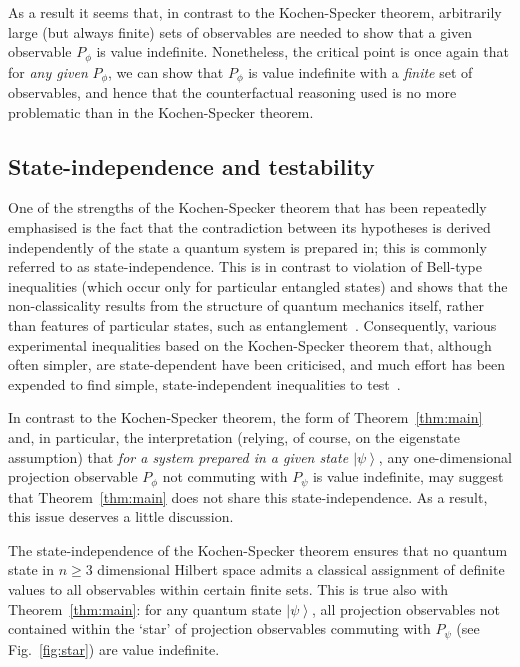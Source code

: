 \documentclass[%
 superscriptaddress,
 preprint,
 showpacs,
 showkeys,
 nofootinbib,
  amsmath,amssymb,
  aps,
  longbibliography,
  floatfix,
 ]{revtex4-1}
\theoremstyle{definition}
\newcommand{\ket}[1]{\left| #1 \right>}
\begin{document}
As a result it seems that, in contrast to the Kochen-Specker theorem, arbitrarily large {\color{blue} (but always finite)} sets of observables are needed to show that a given observable $P_\phi$ is value indefinite.
Nonetheless, the critical point is once again that for \emph{any given} $P_\phi$, we can show that $P_\phi$ is value indefinite with a \emph{finite} set of observables, and hence that the counterfactual reasoning used is no more problematic than in the Kochen-Specker theorem.



\subsection{State-independence and testability}

One of the strengths of the Kochen-Specker theorem that has been repeatedly emphasised is the fact that the contradiction between its hypotheses is derived independently of the state a quantum system is prepared in; this is commonly referred to as state-independence.
This is in contrast to violation of Bell-type inequalities (which occur only for particular entangled states) and shows that the non-classicality  results from the structure of quantum mechanics itself, rather than features of particular states, such as entanglement~\cite{Kirchmair:2009gr,Zu:2012tj}.
Consequently, various experimental inequalities based on the Kochen-Specker theorem that, although often simpler, are state-dependent have been criticised, and much effort has been expended to find simple, state-independent inequalities to test~\cite{Cabello:2008hc}.

In contrast to the Kochen-Specker theorem, the form of Theorem~\ref{thm:main} and, in particular, the interpretation (relying, of course, on the eigenstate assumption) that \emph{for a system prepared in a given state $\ket{\psi}$}, any {\color{blue}one-dimensional projection} observable $P_\phi$ not commuting with $P_\psi$ is value indefinite, may suggest that Theorem~\ref{thm:main} does not share this state-independence.
As a result, this issue deserves a little discussion.

The state-independence of the Kochen-Specker theorem ensures that no quantum state in $n\ge 3$ dimensional Hilbert space admits a classical assignment of definite values to all observables within certain finite sets.
This is true also with Theorem~\ref{thm:main}: for any quantum state $\ket{\psi}$, all {\color{blue}projection} observables not contained within the `star' of {\color{blue}projection} observables commuting with $P_\psi$ (see Fig.~\ref{fig:star}) are value indefinite.
\end{document}
